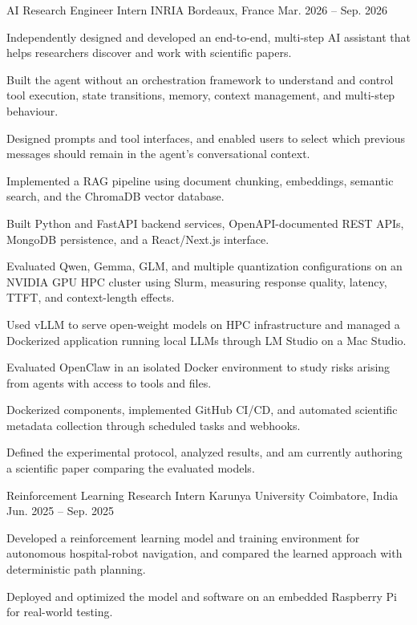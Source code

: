 
\begin{cventries}
  \cventry
    {AI Research Engineer Intern}
    {INRIA}
    {Bordeaux, France}
    {Mar. 2026 -- Sep. 2026}
    {
      \begin{cvitems}
        \item {Independently designed and developed an end-to-end, multi-step AI assistant that helps researchers discover and work with scientific papers.}
        \item {Built the agent without an orchestration framework to understand and control tool execution, state transitions, memory, context management, and multi-step behaviour.}
        \item {Designed prompts and tool interfaces, and enabled users to select which previous messages should remain in the agent's conversational context.}
        \item {Implemented a RAG pipeline using document chunking, embeddings, semantic search, and the ChromaDB vector database.}
        \item {Built Python and FastAPI backend services, OpenAPI-documented REST APIs, MongoDB persistence, and a React/Next.js interface.}
        \item {Evaluated Qwen, Gemma, GLM, and multiple quantization configurations on an NVIDIA GPU HPC cluster using Slurm, measuring response quality, latency, TTFT, and context-length effects.}
        \item {Used vLLM to serve open-weight models on HPC infrastructure and managed a Dockerized application running local LLMs through LM Studio on a Mac Studio.}
        \item {Evaluated OpenClaw in an isolated Docker environment to study risks arising from agents with access to tools and files.}
        \item {Dockerized components, implemented GitHub CI/CD, and automated scientific metadata collection through scheduled tasks and webhooks.}
        \item {Defined the experimental protocol, analyzed results, and am currently authoring a scientific paper comparing the evaluated models.}
      \end{cvitems}
    }

  \cventry
    {Reinforcement Learning Research Intern}
    {Karunya University}
    {Coimbatore, India}
    {Jun. 2025 -- Sep. 2025}
    {
      \begin{cvitems}
        \item {Developed a reinforcement learning model and training environment for autonomous hospital-robot navigation, and compared the learned approach with deterministic path planning.}
        \item {Deployed and optimized the model and software on an embedded Raspberry Pi for real-world testing.}
      \end{cvitems}
    }
\end{cventries}
